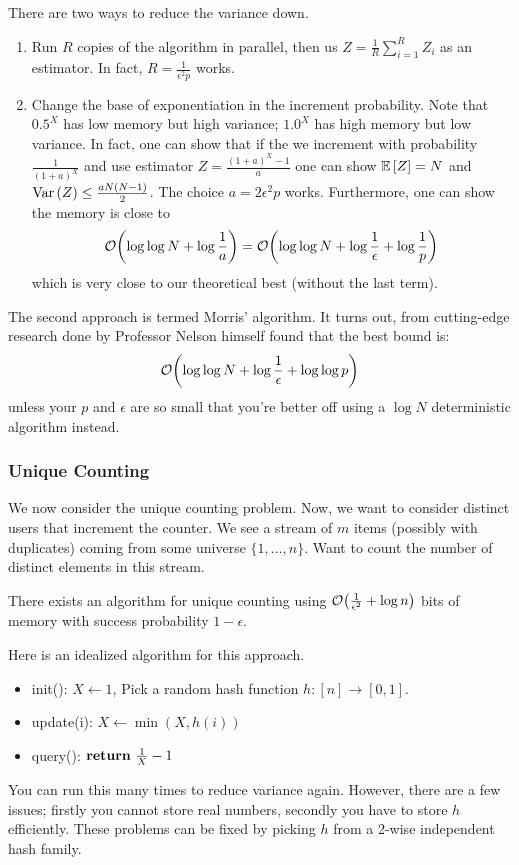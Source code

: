 There are two ways to reduce the variance down.
\begin{enumerate}
    \item Run $R$ copies of the algorithm in parallel, then us $Z = \frac{1}{R} \sum_{i = 1}^R Z_i$ as an estimator. In fact, $R = \frac{1}{\epsilon^2 p}$ works.
    \item Change the base of exponentiation in the increment probability. Note that $0.5^X$ has low memory but high variance; $1.0^X$ has high memory but low variance. In fact, one can show that if the we increment with probability $\frac{1}{(1+a)^X}$ and use estimator $Z = \frac{(1 + a)^X - 1}{a}$ one can show $\mathbb{E}\left[ Z \right] = N$
    and $\text{Var}\left( Z \right) \leq \frac{a N(N - 1)}{2}$. The choice $a = 2 \epsilon^2 p$ works. Furthermore, one can show the memory is close to 
    \[ \mathcal{O}\qty(\log \log N + \log \frac{1}{a}) = \mathcal{O}\qty(\log \log N + \log \frac{1}{\epsilon} + \log \frac{1}{p}) \]
    which is very close to our theoretical best (without the last term).
\end{enumerate}

The second approach is termed Morris' algorithm. It turns out, from cutting-edge research done by Professor Nelson himself found that the best bound is:
\[ \mathcal{O}\qty(\log \log N + \log \frac{1}{\epsilon} + \log \log p) \]
unless your $p$ and $\epsilon$ are so small that you're better off using a $\log N$ deterministic algorithm instead.

\subsubsection{Unique Counting}

We now consider the unique counting problem. Now, we want to consider distinct users that increment the counter. We see a stream of $m$ items (possibly with duplicates)
coming from some universe $\{1, \dots, n\}$. Want to count the number of distinct elements in this stream.

\begin{theorem}
    There exists an algorithm for unique counting using $\mathcal{O}\qty(\frac{1}{\epsilon^2} + \log n)$ bits of memory with success probability $ 1 - \epsilon$.
\end{theorem}

Here is an idealized algorithm for this approach.
\begin{itemize}
    \item init(): $X \gets 1$, Pick a random hash function $h: [n] \to [0, 1]$.
    \item update(i): $X \gets \min(X, h(i))$
    \item query(): $\Return \text{ } \frac{1}{X} - 1$
\end{itemize}

You can run this many times to reduce variance again. However, there are a few issues; firstly you cannot store real numbers, secondly you have to store $h$ efficiently. These problems can be fixed
by picking $h$ from a 2-wise independent hash family.